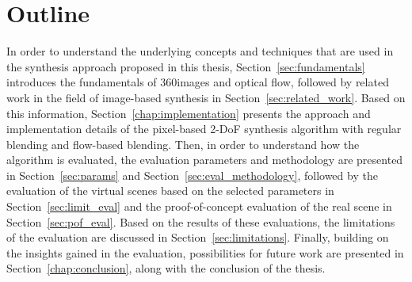 

\section*{Outline}
In order to understand the underlying concepts and techniques that are used in the synthesis approach proposed in this thesis, Section~\ref{sec:fundamentals} introduces the fundamentals of 360\degree images and optical flow, followed by related work in the field of image-based synthesis in Section~\ref{sec:related_work}.
Based on this information, Section~\ref{chap:implementation} presents the approach and implementation details of the pixel-based 2-DoF synthesis algorithm with regular blending and flow-based blending.
Then, in order to understand how the algorithm is evaluated, the evaluation parameters and methodology are presented in Section~\ref{sec:params} and Section~\ref{sec:eval_methodology}, followed by the evaluation of the virtual scenes based on the selected parameters in Section~\ref{sec:limit_eval} and the proof-of-concept evaluation of the real scene in Section~\ref{sec:pof_eval}. Based on the results of these evaluations, the limitations of the evaluation are discussed in Section~\ref{sec:limitations}.
Finally, building on the insights gained in the evaluation, possibilities for future work are presented in Section~\ref{chap:conclusion}, along with the conclusion of the thesis.


